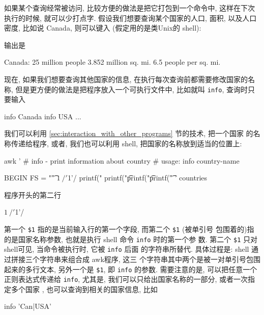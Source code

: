 如果某个查询经常被访问, 比较方便的做法是把它打包到一个命令中, 这样在下次
执行的时候, 就可以少打点字. 假设我们想要查询某个国家的人口, 面积, 以及人口 
密度, 比如说 Canada, 则可以键入 (假定用的是类Unix的 shell):
输出是 
\begin{awkcode}
    Canada:
        25 million people
        3.852 million sq. mi.
        6.5 people per sq. mi.
\end{awkcode}
现在, 如果我们想要查询其他国家的信息, 在执行每次查询前都需要修改国家的名称,
但是更方便的做法是把程序放入一个可执行文件中, 比如就叫 \verb'info',
查询时只要输入
\begin{awkcode}
    info Canada
    info USA
    ...
\end{awkcode}
我们可以利用 
\ref{sec:interaction_with_other_programs}
 节的技术, 把一个国家
的名称传递给程序, 或者, 我们也可以利用 shell, 把国家的名称放到适当的位置上:
\begin{awkcode}
    awk '
    # info - print information about country
    #    usage: info country-name

    BEGIN { FS = "\t" }
    $1 ~ /'$1'/ {
        printf("%
        printf("\t%
        printf("\t%
        printf("\t%
    }
    ' countries
\end{awkcode}
程序开头的第二行
\begin{awkcode}
    $1 ~ /'$1'/
\end{awkcode}
第一个 \verb'$1' 指的是当前输入行的第一个字段, 而第二个 \verb'$1' (被单引号
包围着的)指的是国家名称参数, 也就是执行 shell 命令 \verb'info' 时的第一个参
数. 第二个 \verb'$1' 只对shell可见, 当命令被执行时, 它被 \verb'info' 后面 
的字符串所替代. 具体过程是: shell 通过拼接三个字符串来组合成 awk程序, 这三 
个字符串其中两个是被一对单引号包围起来的多行文本, 另外一个是 \verb'$1',
即 \texttt{info} 的参数. 需要注意的是, 可以把任意一个正则表达式传递给
\texttt{info}, 尤其是, 我们可以只给出国家名称的一部分, 或者一次指定多个国家
, 也可以查询到相关的国家信息, 比如 
\begin{awkcode}
    info 'Can|USA'
\end{awkcode}

